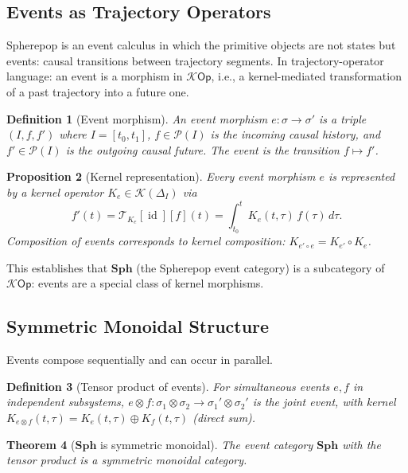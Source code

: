 \documentclass[12pt]{article}
\newtheorem{theorem}{Theorem}[section]
\newtheorem{proposition}[theorem]{Proposition}
\newtheorem{definition}[theorem]{Definition}
\DeclareMathOperator{\id}{id}
\newcommand{\Pcal}{\mathcal{P}}
\newcommand{\Kcal}{\mathcal{K}}
\begin{document}
\subsection{Events as Trajectory Operators}

Spherepop is an event calculus in which the primitive objects are not
states but events: causal transitions between trajectory segments. In
trajectory-operator language: an event is a morphism in $\Kcal\mathsf{Op}$,
i.e., a kernel-mediated transformation of a past trajectory into a
future one.

\begin{definition}[Event morphism]
An \emph{event morphism} $e \colon \sigma \to \sigma'$ is a triple
$(I, f, f')$ where $I = [t_0, t_1]$, $f \in \Pcal(I)$ is the
incoming causal history, and $f' \in \Pcal(I)$ is the outgoing causal
future. The event is the transition $f \mapsto f'$.
\end{definition}

\begin{proposition}[Kernel representation]
Every event morphism $e$ is represented by a kernel operator
$K_e \in \Kcal(\Delta_I)$ via
\[
  f'(t) = \mathcal{T}_{K_e}[\id][f](t) = \int_{t_0}^t K_e(t,\tau)\, f(\tau)\, d\tau.
\]
Composition of events corresponds to kernel composition:
$K_{e'\circ e} = K_{e'}\circ K_e$.
\end{proposition}

This establishes that $\mathbf{Sph}$ (the Spherepop event category) is a
subcategory of $\Kcal\mathsf{Op}$: events are a special class of kernel
morphisms.

\subsection{Symmetric Monoidal Structure}

Events compose sequentially and can occur in parallel.

\begin{definition}[Tensor product of events]
For simultaneous events $e, f$ in independent subsystems,
$e \otimes f \colon \sigma_1\otimes\sigma_2 \to \sigma_1'\otimes\sigma_2'$
is the joint event, with kernel $K_{e\otimes f}(t,\tau) = K_e(t,\tau)
\oplus K_f(t,\tau)$ (direct sum).
\end{definition}

\begin{theorem}[$\mathbf{Sph}$ is symmetric monoidal]
\label{thm:symmono}
The event category $\mathbf{Sph}$ with the tensor product is a symmetric
monoidal category.
\end{theorem}
\end{document}
